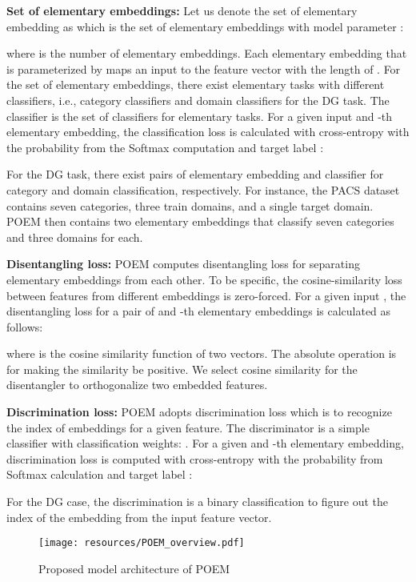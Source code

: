 \documentclass[letterpaper]{article} \usepackage{aaai23}  \usepackage{times}  \usepackage{helvet}  \usepackage{courier}  \usepackage[hyphens]{url}  \usepackage{graphicx} \urlstyle{rm} \def\UrlFont{\rm}  \usepackage{natbib}  \usepackage{caption} \frenchspacing  \setlength{\pdfpagewidth}{8.5in}  \setlength{\pdfpageheight}{11in}  \usepackage[labelsep=period]{caption}
\begin{document}
\textbf{Set of elementary embeddings:}
Let us denote the set of elementary embedding as  which is the set of elementary embeddings  with model parameter :

where  is the number of elementary embeddings.
Each elementary embedding  that is parameterized by  maps an input  to the feature vector with the length of .
For the set of elementary embeddings, there exist  elementary tasks with different classifiers, i.e., category classifiers and domain classifiers for the DG task.
The classifier  is the set of  classifiers for elementary tasks.
For a given input  and -th elementary embedding, the classification loss  is calculated with cross-entropy  with the probability from the Softmax computation and target label :

For the DG task, there exist  pairs of elementary embedding and classifier for category and domain classification, respectively.
For instance, the PACS dataset contains seven categories, three train domains, and a single target domain. 
POEM then contains two elementary embeddings that classify seven categories and three domains for each.

\textbf{Disentangling loss:}
POEM computes disentangling loss for separating elementary embeddings from each other.
To be specific, the cosine-similarity loss between features from different embeddings is zero-forced.
For a given input , the disentangling loss  for a pair of  and -th  elementary embeddings is calculated as follows:

where  is the cosine similarity function of two vectors. The absolute operation  is for making the similarity be positive. We select cosine similarity for the disentangler to orthogonalize two embedded features. 

\textbf{Discrimination loss:}
POEM adopts discrimination loss which is to recognize the index of embeddings for a given feature. The discriminator  is a simple classifier with  classification weights: . 
For a given  and -th elementary embedding, discrimination loss  is computed with cross-entropy with the probability from Softmax calculation and target label :

For the DG case, the discrimination is a binary classification to figure out the index of the embedding from the input feature vector. 


\begin{figure}[t]
	\centering
	\texttt{[image: resources/POEM\_overview.pdf]}
	\caption{Proposed model architecture of POEM}
\label{fig:overview}
\end{figure}	
\end{document}
